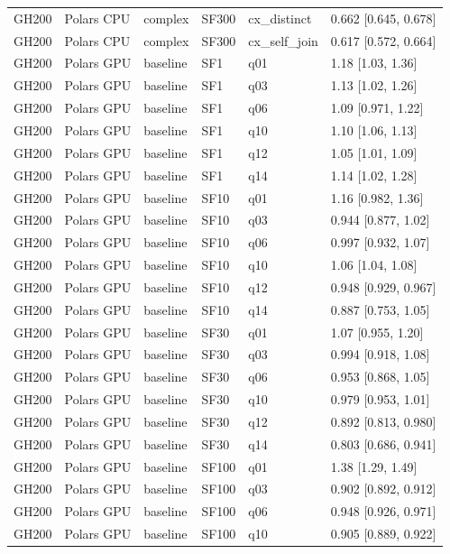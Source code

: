 \begin{longtable}{llllll}
GH200 & Polars CPU & complex & SF300 & cx\_distinct & 0.662 [0.645, 0.678] \\
GH200 & Polars CPU & complex & SF300 & cx\_self\_join & 0.617 [0.572, 0.664] \\
GH200 & Polars GPU & baseline & SF1 & q01 & 1.18 [1.03, 1.36] \\
GH200 & Polars GPU & baseline & SF1 & q03 & 1.13 [1.02, 1.26] \\
GH200 & Polars GPU & baseline & SF1 & q06 & 1.09 [0.971, 1.22] \\
GH200 & Polars GPU & baseline & SF1 & q10 & 1.10 [1.06, 1.13] \\
GH200 & Polars GPU & baseline & SF1 & q12 & 1.05 [1.01, 1.09] \\
GH200 & Polars GPU & baseline & SF1 & q14 & 1.14 [1.02, 1.28] \\
GH200 & Polars GPU & baseline & SF10 & q01 & 1.16 [0.982, 1.36] \\
GH200 & Polars GPU & baseline & SF10 & q03 & 0.944 [0.877, 1.02] \\
GH200 & Polars GPU & baseline & SF10 & q06 & 0.997 [0.932, 1.07] \\
GH200 & Polars GPU & baseline & SF10 & q10 & 1.06 [1.04, 1.08] \\
GH200 & Polars GPU & baseline & SF10 & q12 & 0.948 [0.929, 0.967] \\
GH200 & Polars GPU & baseline & SF10 & q14 & 0.887 [0.753, 1.05] \\
GH200 & Polars GPU & baseline & SF30 & q01 & 1.07 [0.955, 1.20] \\
GH200 & Polars GPU & baseline & SF30 & q03 & 0.994 [0.918, 1.08] \\
GH200 & Polars GPU & baseline & SF30 & q06 & 0.953 [0.868, 1.05] \\
GH200 & Polars GPU & baseline & SF30 & q10 & 0.979 [0.953, 1.01] \\
GH200 & Polars GPU & baseline & SF30 & q12 & 0.892 [0.813, 0.980] \\
GH200 & Polars GPU & baseline & SF30 & q14 & 0.803 [0.686, 0.941] \\
GH200 & Polars GPU & baseline & SF100 & q01 & 1.38 [1.29, 1.49] \\
GH200 & Polars GPU & baseline & SF100 & q03 & 0.902 [0.892, 0.912] \\
GH200 & Polars GPU & baseline & SF100 & q06 & 0.948 [0.926, 0.971] \\
GH200 & Polars GPU & baseline & SF100 & q10 & 0.905 [0.889, 0.922] \\

\end{longtable}
